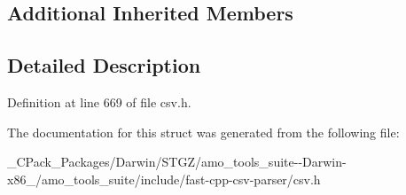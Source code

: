\subsection*{Additional Inherited Members}


\subsection{Detailed Description}


Definition at line 669 of file csv.\+h.



The documentation for this struct was generated from the following file\+:\begin{DoxyCompactItemize}
\item 
\+\_\+\+C\+Pack\+\_\+\+Packages/\+Darwin/\+S\+T\+G\+Z/amo\+\_\+tools\+\_\+suite-\/-\/\+Darwin-\/x86\+\_/amo\+\_\+tools\+\_\+suite/include/fast-\/cpp-\/csv-\/parser/csv.\+h\end{DoxyCompactItemize}
